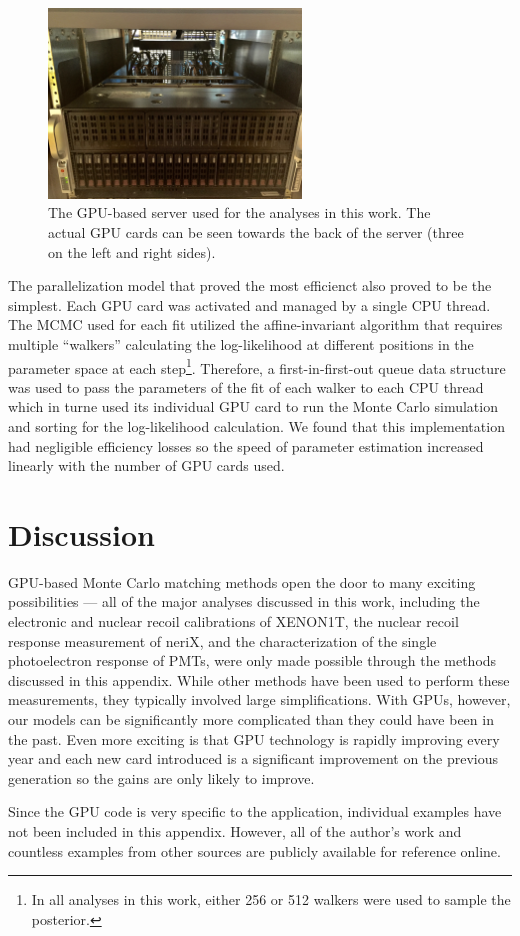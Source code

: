 \begin{figure}[t]
        \centering
	\includegraphics[width=0.6\textwidth]{gpu_server}
	\caption{The GPU-based server used for the analyses in this work.  The actual GPU cards can be seen towards the back of the server (three on the left and right sides).}
	\label{fig:gpu_server}
\end{figure}


The parallelization model that proved the most efficienct also proved to be the simplest.  Each GPU card was activated and managed by a single CPU thread.  The MCMC used for each fit utilized the affine-invariant algorithm \cite{foreman2013emcee} that requires multiple ``walkers'' calculating the log-likelihood at different positions in the parameter space at each step\footnote{In all analyses in this work, either 256 or 512 walkers were used to sample the posterior.}.  Therefore, a first-in-first-out queue data structure was used to pass the parameters of the fit of each walker to each CPU thread which in turne used its individual GPU card to run the Monte Carlo simulation and sorting for the log-likelihood calculation.  We found that this implementation had negligible efficiency losses so the speed of parameter estimation increased linearly with the number of GPU cards used.


\section{Discussion}


GPU-based Monte Carlo matching methods open the door to many exciting possibilities --- all of the major analyses discussed in this work, including the electronic and nuclear recoil calibrations of XENON1T, the nuclear recoil response measurement of neriX, and the characterization of the single photoelectron response of PMTs, were only made possible through the methods discussed in this appendix.  While other methods have been used to perform these measurements, they typically involved large simplifications.  With GPUs, however, our models can be significantly more complicated than they could have been in the past.  Even more exciting is that GPU technology is rapidly improving every year and each new card introduced is a significant improvement on the previous generation so the gains are only likely to improve.

Since the GPU code is very specific to the application, individual examples have not been included in this appendix.  However, all of the author's work and countless examples from other sources are publicly available for reference online.




